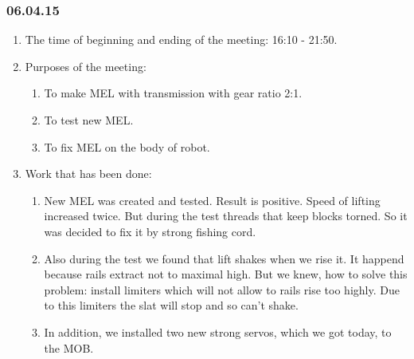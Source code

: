 \subsubsection{06.04.15}
\begin{enumerate}
	
	\item The time of beginning and ending of the meeting: 16:10 - 21:50.
	
	\item Purposes of the meeting: 
	\begin{enumerate}
		
		\item To make MEL with transmission with gear ratio 2:1.
		
		\item To test new MEL.
		
        \item To fix MEL on the body of robot.
		
	\end{enumerate}

	\item Work that has been done:
	\begin{enumerate}
		
		\item New MEL was created and tested. Result is positive. Speed of lifting increased twice. But during the test threads that keep blocks torned. So it was decided to fix it by strong fishing cord.
		
		\item Also during the test we found that lift shakes when we rise it. It happend because rails extract not to maximal high. But we knew, how to solve this problem: install limiters which will not allow to rails rise too highly. Due to this limiters the slat will stop and so can't shake.
		
		\item In addition, we installed two new strong servos, which we got today, to the MOB.
		\begin{figure}[H]
			\begin{minipage}[h]{0.2\linewidth}
				\center  
			\end{minipage}
			\begin{minipage}[h]{0.6\linewidth}
				\caption{}
			\end{minipage}
		\end{figure}


\end{enumerate}
\end{enumerate}
